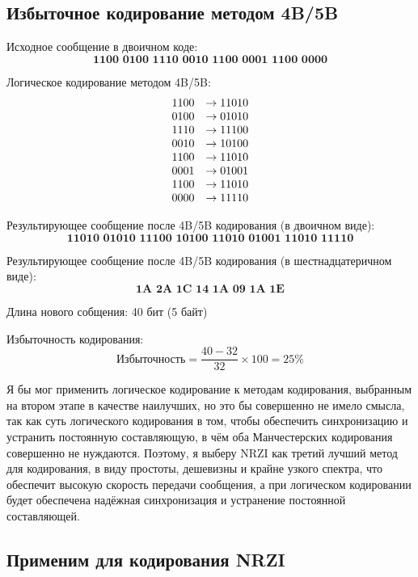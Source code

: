 \subsection{Избыточное кодирование методом 4B/5B}

\item Исходное сообщение в двоичном коде:
\[
	\textbf{1100 0100 1110 0010 1100 0001 1100 0000}
\]

\item Логическое кодирование методом 4B/5B:
\[
	\begin{array}{l l}
		\text{1100} & \rightarrow \text{11010} \\
		\text{0100} & \rightarrow \text{01010} \\
		\text{1110} & \rightarrow \text{11100} \\
		\text{0010} & \rightarrow \text{10100} \\
		\text{1100} & \rightarrow \text{11010} \\
		\text{0001} & \rightarrow \text{01001} \\
		\text{1100} & \rightarrow \text{11010} \\
		\text{0000} & \rightarrow \text{11110} \\
	\end{array}
\]

\item Результирующее сообщение после 4B/5B кодирования (в двоичном виде):
\[
	\textbf{11010 01010 11100 10100 11010 01001 11010 11110}
\]

\item Результирующее сообщение после 4B/5B кодирования (в шестнадцатеричном виде):
\[
	\textbf{1A 2A 1C 14 1A 09 1A 1E}
\]

\item Длина нового собщения: 40 бит (5 байт)
\item Избыточность кодирования:
\[
	\text{Избыточность} = \frac{40 - 32}{32} \times 100 = 25\%
\]


Я бы мог применить логическое кодирование к методам кодирования, выбранным на втором этапе в качестве наилучших, но это бы совершенно не имело смысла, так как суть логического кодирования в том, чтобы обеспечить синхронизацию и устранить постоянную составляющую, в чём оба Манчестерских кодирования совершенно не нуждаются. Поэтому, я выберу NRZI как третий лучший метод для кодирования, в виду простоты, дешевизны и крайне узкого спектра, что обеспечит высокую скорость передачи сообщения, а при логическом кодировании будет обеспечена надёжная синхронизация и устранение постоянной составляющей.

\subsection{Применим для кодирования NRZI}


